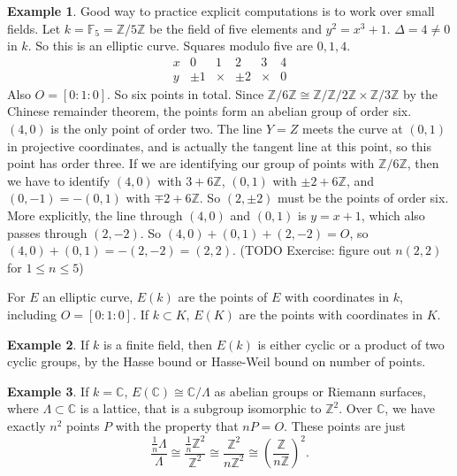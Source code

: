 \documentclass{article}
\newcommand{\F}{\mathbb{F}}
\newcommand{\Z}{\mathbb{Z}}
\newcommand{\C}{\mathbb{C}}
\newcommand{\rb}[1]{\left( #1 \right)}
\renewcommand{\sb}[1]{\left[ #1 \right]}
\theoremstyle{definition}\newtheorem{definition}{Definition}[section]
\theoremstyle{definition}\newtheorem{remark}[definition]{Remark}
\theoremstyle{definition}\newtheorem*{example}{Example}
\theoremstyle{definition}\newtheorem*{note}{Note}
\begin{document}
\begin{example}
Good way to practice explicit computations is to work over small fields. Let $ k = \F_5 = \Z / 5\Z $ be the field of five elements and $ y^2 = x^3 + 1 $. $ \Delta = 4 \ne 0 $ in $ k $. So this is an elliptic curve. Squares modulo five are $ 0, 1, 4 $.
$$
\begin{array}{c|ccccc}
x & 0 & 1 & 2 & 3 & 4 \\
\hline
y & \pm 1 & \times & \pm 2 & \times & 0
\end{array}
$$
Also $ O = \sb{0 : 1 : 0} $. So six points in total. Since $ \Z / 6\Z \cong \Z / \Z / 2\Z \times \Z / 3\Z $ by the Chinese remainder theorem, the points form an abelian group of order six. $ \rb{4, 0} $ is the only point of order two. The line $ Y = Z $ meets the curve at $ \rb{0, 1} $ in projective coordinates, and is actually the tangent line at this point, so this point has order three. If we are identifying our group of points with $ \Z / 6\Z $, then we have to identify $ \rb{4, 0} $ with $ 3 + 6\Z $, $ \rb{0, 1} $ with $ \pm 2 + 6\Z $, and $ \rb{0, -1} = -\rb{0, 1} $ with $ \mp 2 + 6\Z $. So $ \rb{2, \pm 2} $ must be the points of order six. More explicitly, the line through $ \rb{4, 0} $ and $ \rb{0, 1} $ is $ y = x + 1 $, which also passes through $ \rb{2, -2} $. So $ \rb{4, 0} + \rb{0, 1} + \rb{2, -2} = O $, so $ \rb{4, 0} + \rb{0, 1} = -\rb{2, -2} = \rb{2, 2} $. (TODO Exercise: figure out $ n\rb{2, 2} $ for $ 1 \le n \le 5 $)
\end{example}

For $ E $ an elliptic curve, $ E\rb{k} $ are the points of $ E $ with coordinates in $ k $, including $ O = \sb{0 : 1 : 0} $. If $ k \subset K $, $ E\rb{K} $ are the points with coordinates in $ K $.

\begin{example}
If $ k $ is a finite field, then $ E\rb{k} $ is either cyclic or a product of two cyclic groups, by the Hasse bound or Hasse-Weil bound on number of points.
\end{example}

\begin{example}
If $ k = \C $, $ E\rb{\C} \cong \C / \Lambda $ as abelian groups or Riemann surfaces, where $ \Lambda \subset \C $ is a lattice, that is a subgroup isomorphic to $ \Z^2 $. Over $ \C $, we have exactly $ n^2 $ points $ P $ with the property that $ nP = O $. These points are just
$$ \dfrac{\tfrac{1}{n}\Lambda}{\Lambda} \cong \dfrac{\tfrac{1}{n}\Z^2}{\Z^2} \cong \dfrac{\Z^2}{n\Z^2} \cong \rb{\dfrac{\Z}{n\Z}}^2. $$
\end{example}
\end{document}
